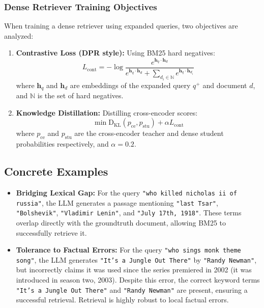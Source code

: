 \documentclass[11pt,a4paper]{article}
\begin{document}
\subsubsection{Dense Retriever Training Objectives}
When training a dense retriever using expanded queries, two objectives are analyzed:
\begin{enumerate}
    \item \textbf{Contrastive Loss (DPR style):} Using BM25 hard negatives:
    \begin{equation}
    L_{\text{cont}} = -\log \frac{e^{\mathbf{h}_q \cdot \mathbf{h}_d}}{e^{\mathbf{h}_q \cdot \mathbf{h}_d} + \sum_{d_i \in \mathbb{N}} e^{\mathbf{h}_q \cdot \mathbf{h}_{d_i}}}
    \end{equation}
    where $\mathbf{h}_q$ and $\mathbf{h}_d$ are embeddings of the expanded query $q^+$ and document $d$, and $\mathbb{N}$ is the set of hard negatives.
    \item \textbf{Knowledge Distillation:} Distilling cross-encoder scores:
    \begin{equation}
    \min \text{D}_{\text{KL}}(p_{\text{ce}}, p_{\text{stu}}) + \alpha L_{\text{cont}}
    \end{equation}
    where $p_{\text{ce}}$ and $p_{\text{stu}}$ are the cross-encoder teacher and dense student probabilities respectively, and $\alpha = 0.2$.
\end{enumerate}

\subsection{Concrete Examples}
\begin{itemize}
    \item \textbf{Bridging Lexical Gap:} For the query \texttt{"who killed nicholas ii of russia"}, the LLM generates a passage mentioning \texttt{"last Tsar"}, \texttt{"Bolshevik"}, \texttt{"Vladimir Lenin"}, and \texttt{"July 17th, 1918"}. These terms overlap directly with the groundtruth document, allowing BM25 to successfully retrieve it.
    \item \textbf{Tolerance to Factual Errors:} For the query \texttt{"who sings monk theme song"}, the LLM generates \texttt{"It's a Jungle Out There"} by \texttt{"Randy Newman"}, but incorrectly claims it was used since the series premiered in 2002 (it was introduced in season two, 2003). Despite this error, the correct keyword terms \texttt{"It's a Jungle Out There"} and \texttt{"Randy Newman"} are present, ensuring a successful retrieval. Retrieval is highly robust to local factual errors.
\end{itemize}
\end{document}
